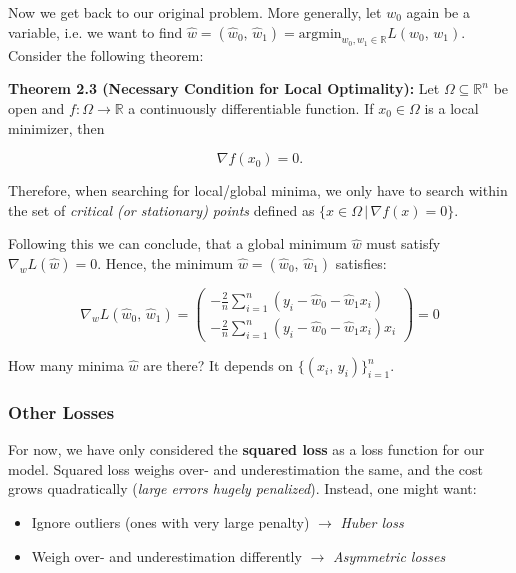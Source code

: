 \documentclass[a4paper]{extarticle}
\begin{document}
Now we get back to our original problem. More generally, let \(w_0\) again be a variable, i.e. we want to find \(\hat{w} = (\hat{w}_0, \, \hat{w}_1) = \text{argmin}_{w_0,w_1 \in \mathbb{R}} L(w_0, \, w_1)\). Consider the following theorem:

\begin{tbox}
	\textbf{Theorem 2.3 (Necessary Condition for Local Optimality):} Let \(\Omega \subseteq \mathbb{R}^n\) be open and \(f : \Omega \to \mathbb{R}\) a continuously differentiable function. If \(x_0 \in \Omega\) is a local minimizer, then

	\[
		\nabla f(x_0) = 0.	
	\]

	Therefore, when searching for local/global minima, we only have to search within the set of \textit{critical (or stationary) points} defined as \(\{x \in \Omega \, | \, \nabla f(x) = 0\}\).
\end{tbox}

Following this we can conclude, that a global minimum \(\hat{w}\) must satisfy \(\nabla_w L(\hat{w}) = 0\). Hence, the minimum \(\hat{w} = (\hat{w}_0, \, \hat{w}_1)\) satisfies:

\[
	\nabla_w L(\hat{w}_0, \, \hat{w}_1) =
	\begin{pmatrix}
		- \frac{2}{n} \sum_{i = 1}^n (y_i - \hat{w}_0 - \hat{w}_1x_i) \\
		- \frac{2}{n} \sum_{i = 1}^n (y_i - \hat{w}_0 - \hat{w}_1x_i)x_i
	\end{pmatrix}
	= 0
\]

How many minima \(\hat{w}\) are there? It depends on \(\{(x_i, \, y_i)\}_{i = 1}^n\).

\subsubsection{Other Losses}

For now, we have only considered the \textbf{squared loss} as a loss function for our model. Squared loss weighs over- and underestimation the same, and the cost grows quadratically (\textit{large errors hugely penalized}). Instead, one might want:

\begin{itemize}
	\item Ignore outliers (ones with very large penalty) \(\rightarrow\) \textit{Huber loss}
	\item Weigh over- and underestimation differently \(\rightarrow\) \textit{Asymmetric losses}
\end{itemize}
\end{document}
